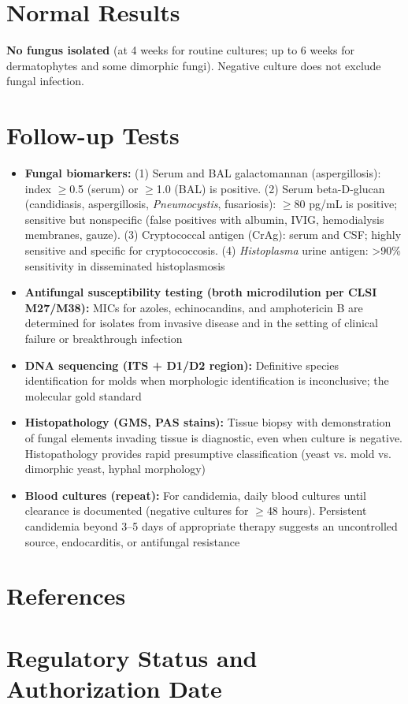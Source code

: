 \section*{Normal Results}
\textbf{No fungus isolated} (at 4 weeks for routine cultures; up to 6 weeks for dermatophytes and some dimorphic fungi). Negative culture does not exclude fungal infection.

\section*{Follow-up Tests}
\begin{itemize}
  \item \textbf{Fungal biomarkers:} (1) Serum and BAL galactomannan (aspergillosis): index $\geq$0.5 (serum) or $\geq$1.0 (BAL) is positive. (2) Serum beta-D-glucan (candidiasis, aspergillosis, \textit{Pneumocystis}, fusariosis): $\geq$80 pg/mL is positive; sensitive but nonspecific (false positives with albumin, IVIG, hemodialysis membranes, gauze). (3) Cryptococcal antigen (CrAg): serum and CSF; highly sensitive and specific for cryptococcosis. (4) \textit{Histoplasma} urine antigen: >90\% sensitivity in disseminated histoplasmosis
  \item \textbf{Antifungal susceptibility testing (broth microdilution per CLSI M27/M38):} MICs for azoles, echinocandins, and amphotericin B are determined for isolates from invasive disease and in the setting of clinical failure or breakthrough infection \cite{clsi2017m27,clsi2017m38}
  \item \textbf{DNA sequencing (ITS + D1/D2 region):} Definitive species identification for molds when morphologic identification is inconclusive; the molecular gold standard
  \item \textbf{Histopathology (GMS, PAS stains):} Tissue biopsy with demonstration of fungal elements invading tissue is diagnostic, even when culture is negative. Histopathology provides rapid presumptive classification (yeast vs. mold vs. dimorphic yeast, hyphal morphology)
  \item \textbf{Blood cultures (repeat):} For candidemia, daily blood cultures until clearance is documented (negative cultures for $\geq$48 hours). Persistent candidemia beyond 3--5 days of appropriate therapy suggests an uncontrolled source, endocarditis, or antifungal resistance
\end{itemize}

\section*{References}



\clearpage
\section*{Regulatory Status and Authorization Date}

\clearpage
